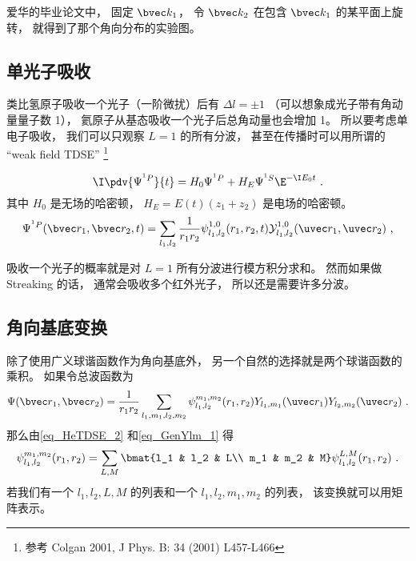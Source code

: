 爱华的毕业论文中， 固定 $\bvec k_1$， 令 $\bvec k_2$ 在包含 $\bvec k_1$ 的某平面上旋转， 就得到了那个角向分布的实验图。

\subsection{单光子吸收}

类比氢原子吸收一个光子（一阶微扰）后有 $\Delta l = \pm 1$ （可以想象成光子带有角动量量子数 1）， 氦原子从基态吸收一个光子后总角动量也会增加 1。 所以要考虑单电子吸收， 我们可以只观察 $L = 1$ 的所有分波， 甚至在传播时可以用所谓的 “weak field TDSE” \footnote{参考 Colgan 2001, J Phys. B: 34 (2001) L457-L466}

\begin{equation}
\I \pdv{\Psi^{^1P}}{t} = H_0 \Psi^{^1P} + H_E \Psi^{^1S} \E^{-\I E_0 t}~.
\end{equation}
其中 $H_0$ 是无场的哈密顿， $H_E = E(t) (z_1 + z_2)$ 是电场的哈密顿。
\begin{equation}
\Psi^{^1P}(\bvec r_1, \bvec r_2, t) = \sum_{l_1, l_2} \frac{1}{r_1 r_2} \psi_{l_1, l_2}^{1, 0} (r_1, r_2, t) \mathcal Y_{l_1, l_2}^{1, 0} (\uvec r_1, \uvec r_2)~,
\end{equation}

吸收一个光子的概率就是对 $L = 1$ 所有分波进行模方积分求和。 然而如果做 Streaking 的话， 通常会吸收多个红外光子， 所以还是需要许多分波。

\subsection{角向基底变换}
除了使用广义球谐函数作为角向基底外， 另一个自然的选择就是两个球谐函数的乘积。 如果令总波函数为
\begin{equation}\label{eq_HeAnal_6}
\Psi(\bvec r_1, \bvec r_2) = \frac{1}{r_1 r_2} \sum_{l_1, m_1, l_2, m_2} \psi_{l_1, l_2}^{m_1, m_2}(r_1, r_2) Y_{l_1, m_1}(\uvec r_1) Y_{l_2, m_2} (\uvec r_2)~.
\end{equation}
那么由\autoref{eq_HeTDSE_2}  和\autoref{eq_GenYlm_1}  得
\begin{equation}\label{eq_HeAnal_7}
\psi_{l_1, l_2}^{m_1, m_2}(r_1, r_2) = \sum_{L,M} \bmat{l_1 & l_2 & L\\ m_1 & m_2 & M} \psi_{l_1, l_2}^{L,M}(r_1, r_2)~.
\end{equation}
若我们有一个 $l_1, l_2, L, M$ 的列表和一个 $l_1, l_2, m_1, m_2$ 的列表， 该变换就可以用矩阵表示。

